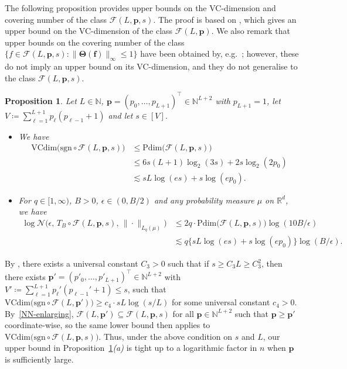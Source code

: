 \documentclass[12pt]{article}
\newcommand{\red}[1]{\textcolor{red}{#1}}
\newtheorem{prop}[thm]{Proposition}
\begin{document}
The following proposition provides upper bounds on the VC-dimension and covering number of the class $\mathcal{F}(L,\bm{p},s)$. The proof is based on \citet[Theorem~7]{bartlett2019nearly}, which gives an upper bound on the VC-dimension of the class $\mathcal{F}(L,\bm{p})$. We also remark that upper bounds on the covering number of the class $\{f\in\mathcal{F}(L,\bm{p},s) : \|\bm{\Theta}(\bm{f})\|_{\infty} \leq 1\}$ have been obtained by, e.g.~\citet[Lemma~5]{schmidt-hieber2020nonparametric}; however, these do not imply an upper bound on its VC-dimension, and they do not generalise to the class $\mathcal{F}(L,\bm{p},s)$.

\begin{prop}\label{prop:VC-upper-bound}
    Let $L\in\mathbb{N}$, $\bm{p} = (p_0,\ldots,p_{L+1})^\top \in \mathbb{N}^{L+2}$ with $p_{L+1}=1$, let $V \coloneqq \sum_{\ell=1}^{L+1} p_\ell(p_{\ell-1}+1)$ and let $s\in[V]$.
    \begin{itemize}
        \item[(a)] We have
        \begin{align*}
            \mathrm{VCdim}\bigl(\mathrm{sgn}\circ\mathcal{F}(L,\bm{p},s)\bigr) &\leq \mathrm{Pdim}\bigl(\mathcal{F}(L,\bm{p},s)\bigr)\\
            &\leq 6s(L+1)\log_2(3s) + 2s\log_2(2p_0) \\
            &\lesssim sL\log (es) + s\log(ep_0).
        \end{align*}
        \item[(b)] For $q \in [1,\infty)$, $B>0$, $\epsilon\in(0, B/2)$ and any probability measure $\mu$ on $\mathbb{R}^d$, we have
        \begin{align*}
            \log \mathcal{N}\bigl(\epsilon,\, T_B \circ \mathcal{F}(L,\bm{p},s),\, \|\cdot\|_{L_q(\mu)} \bigr) &\leq 2q\cdot\mathrm{Pdim}\bigl(\mathcal{F}(L,\bm{p},s)\bigr)\log(10B/\epsilon) \\
            &\lesssim q\bigl\{sL\log (es) + s\log(ep_0)\bigr\}\log(B/\epsilon).
        \end{align*}
    \end{itemize}
\end{prop}
By \citet[Theorem~3]{bartlett2019nearly}, there exists a universal constant $C_3 > 0$ such that if $s \geq C_3 L \geq C_3^2$, then there exists $\bm{p}' = (p'_0,\ldots,p'_{L+1})^\top \in \mathbb{N}^{L+2}$ with $V' \coloneqq \sum_{\ell=1}^{L+1} p_\ell'(p_{\ell-1}'+1) \leq s$, such that $\mathrm{VCdim}\bigl(\mathrm{sgn} \circ \mathcal{F}(L,\bm{p}')\bigr) \geq c_4\cdot sL\log(s/L)$ for some universal constant $c_4>0$.  By~\ref{NN-enlarging}, $\mathcal{F}(L,\bm{p}') \subseteq \mathcal{F}(L,\bm{p},s)$ for all $\bm{p}\in\mathbb{N}^{L+2}$ such that $\bm{p} \geq \bm{p}'$ coordinate-wise, so the same lower bound then applies to $\mathrm{VCdim}\bigl(\mathrm{sgn} \circ \mathcal{F}(L,\bm{p},s)\bigr)$.  Thus, under the above condition on $s$ and $L$, our upper bound in Proposition~\ref{prop:VC-upper-bound}\emph{(a)} is tight up to a logarithmic factor in $n$ when $\bm{p}$ is sufficiently large. %
\end{document}
